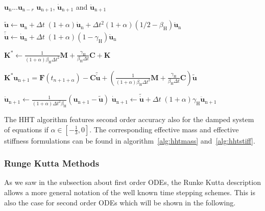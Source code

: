 \begin{algorithm}[hbt]
\caption{The Hilber-Hughes-Taylor Method (Effective Stiffness)} \label{alg:hhtstiff}
\begin{algorithmic}
\REQUIRE $\mathbf{u}_{\mathrm{n}} ... \mathbf{u}_{\mathrm{n}-r}$
\ENSURE  $\mathbf{u}_{\mathrm{n}+1}$, $\mathbf{\dot{u}}_{\mathrm{n}+1}$ and $\mathbf{\ddot{u}}_{\mathrm{n}+1}$

\STATE{}
\STATE $\tilde{\mathbf{u}} \gets \mathbf{u}_{\mathrm{n}} + \Delta t\; (1+\alpha) \mathbf{\dot{u}}_{\mathrm{n}} + \Delta
t^2  (1+\alpha) (1/2 - \beta_\mathrm{H}) \mathbf{\ddot{u}}_{\mathrm{n}}$
\STATE $\mathbf{\tilde{\dot{u}}} \gets \mathbf{\dot{u}}_{\mathrm{n}} + \Delta t\; (1+\alpha) (1-\gamma_{\mathrm{H}}) \mathbf{\ddot{u}}_{\mathrm{n}}$

\STATE {}
\STATE $\mathbf{K}^* \gets \frac{1}{(1+\alpha) \beta_\mathrm{H} \Delta t^2} \mathbf{M} +
\frac{\gamma_\mathrm{H}}{\beta_\mathrm{H}\Delta t} \mathbf{C} + \mathbf{K}$

\STATE {}
\STATE $\mathbf{K}^* \mathbf{u}_{\mathrm{n+1}}= \mathbf{F}(t_{n+1+\alpha}) - \mathbf{C} \mathbf{\tilde{\dot{u}}} + \left(\frac{1}{(1+\alpha) \beta_\mathrm{H} \Delta t^2} \mathbf{M} +
\frac{\gamma_\mathrm{H}}{\beta_\mathrm{H}\Delta t} \mathbf{C}\right) \tilde{\mathbf{u}} $

\STATE {}
\STATE $\mathbf{\ddot{u}}_{\mathrm{n}+1} \gets \frac{1}{(1+\alpha) \Delta
t^2 \beta_\mathrm{H}}(\mathbf{u}_{\mathrm{n+1}} - \tilde{\mathbf{u}})$
\STATE $\mathbf{\dot{u}}_{\mathrm{n}+1} \gets \mathbf{\tilde{\dot{u}}} + \Delta t\; (1+\alpha) \gamma_\mathrm{H}
\mathbf{\ddot{u}}_{\mathrm{n+1}}$
\end{algorithmic}
\end{algorithm}
The HHT algorithm features second order accuracy also for the damped system of equations if $\alpha
\in \left[ -\frac{1}{3} , 0 \right]$. The corresponding effective mass and effective stiffness
formulations can be found in algorithm~\ref{alg:hhtmass} and~\ref{alg:hhtstiff}.
\newpage
\subsubsection{Runge Kutta Methods}
As we saw in the subsection about first order ODEs, the Runke Kutta description allows a more general
notation of the well known time stepping schemes. This is also the case for second order ODEs which
will be shown in the following. 

